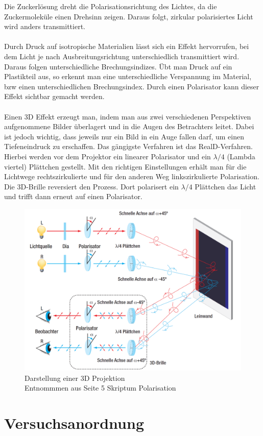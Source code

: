 \documentclass[12pt,a4paper,twoside]{article}
\begin{document}
\noindent
Die Zuckerlösung dreht die Polarisationsrichtung des Lichtes, da die Zuckermoleküle einen Drehsinn zeigen. 
Daraus folgt, zirkular polarisiertes Licht wird anders transmittiert. 
\\
\\
Durch Druck auf isotropische Materialien lässt sich ein Effekt hervorrufen, bei dem Licht je nach Ausbreitungsrichtung unterschiedlich transmittiert wird. Daraus folgen unterschiedliche Brechungsindizes. 
Übt man Druck auf ein Plastikteil aus, so erkennt man eine unterschiedliche Verspannung im Material, bzw einen unterschiedlichen Brechungsindex. 
Durch einen Polarisator kann dieser Effekt sichtbar gemacht werden. 
\\
\\
Einen 3D Effekt erzeugt man, indem man aus zwei verschiedenen Perspektiven aufgenommene Bilder überlagert und in die Augen des Betrachters leitet. 
Dabei ist jedoch wichtig, dass jeweils nur ein Bild in ein Auge fallen darf, um einen Tiefeneindruck zu erschaffen. 
Das gängigste Verfahren ist das RealD-Verfahren. Hierbei werden vor dem Projektor ein linearer Polarisator und ein $\lambda/4$ (Lambda viertel) Plättchen gestellt. 
Mit den richtigen Einstellungen erhält man für die Lichtwege rechtszirkulierte und für den anderen Weg linkszirkulierte Polarisation. \\
Die 3D-Brille reversiert den Prozess. Dort polarisert ein $\lambda/4$ Plättchen das Licht und trifft dann erneut auf einen Polarisator. 

\begin{figure}[H]
    \centering
    \includegraphics[width=0.6\linewidth]{nudes/3D.png}
    \caption{Darstellung einer 3D Projektion \\ Entnommmen aus Seite 5 Skriptum Polarisation \cite{teachcenter2}}
    \label{fig:3D Projektion schema}
\end{figure}

\section{Versuchsanordnung} %
\end{document}
